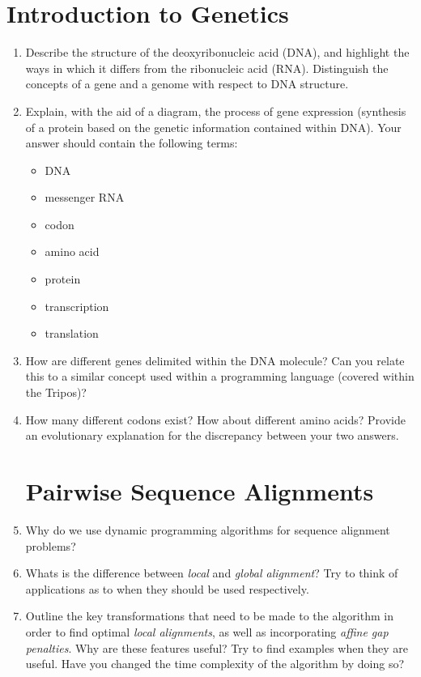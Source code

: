 \documentclass[11pt,runningheads,a4paper]{article}
\begin{document}
\section*{ Introduction to Genetics }
\begin{enumerate}
  \item Describe the structure of the deoxyribonucleic acid (DNA), and highlight the ways in which it differs from the ribonucleic acid (RNA). 
    Distinguish the concepts of a gene and a genome with respect to DNA structure.
\item Explain, with the aid of a diagram, the process of gene expression (synthesis of a protein based on the genetic information contained within DNA).
Your answer should contain the following terms:
\begin{itemize}
\item DNA
\item messenger RNA
\item codon
\item amino acid
\item protein
\item transcription
\item translation
\end{itemize}
\item How are different genes delimited within the DNA molecule? Can you relate this to a similar concept used within a programming language (covered within the Tripos)?
\item How many different codons exist? How about different amino acids? Provide an evolutionary explanation for the discrepancy between your two answers.

\section*{Pairwise Sequence Alignments}

\item Why do we use dynamic programming algorithms for sequence alignment problems?

\item Whats is the difference between \textit{local} and \textit{global alignment}? Try to think of applications as to when they should be used respectively.

\item Outline the key transformations that need to be made to the algorithm in order to find optimal \textit{local alignments}, as well as incorporating \textit{affine gap penalties}. Why are these features useful? Try to find examples when they are useful. Have you changed the time complexity of the algorithm by doing so?


\end{enumerate}
\end{document}

